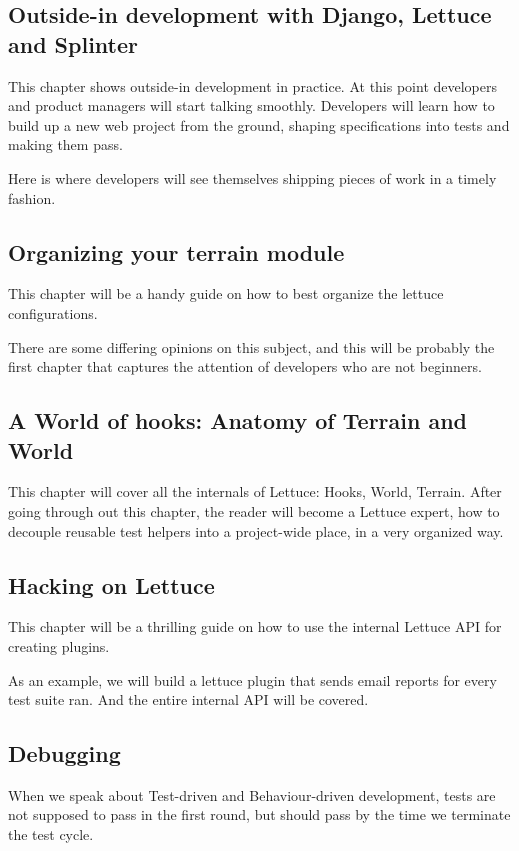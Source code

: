 \documentclass[letterpaper]{article}
\begin{document}
\subsection*{Outside-in development with Django, Lettuce and Splinter}
This chapter shows outside-in development in practice. At this point developers and
product managers will start talking smoothly.
Developers will learn how to build up a new web project from the
ground, shaping specifications into tests and making them pass.

Here is where developers will see themselves shipping pieces of work in a timely fashion.

\subsection*{Organizing your terrain module}
This chapter will be a handy guide on how to best organize the lettuce
configurations.

\noindent
There are some differing opinions on this subject, and this will be
probably the first chapter that captures the attention of developers
who are not beginners.

\subsection*{A World of hooks: Anatomy of Terrain and World}
This chapter will cover all the internals of Lettuce: Hooks, World,
Terrain.  After going through out this chapter, the reader will become
a Lettuce expert, how to decouple reusable test helpers into a
project-wide place, in a very organized way.

\subsection*{Hacking on Lettuce}
This chapter will be a thrilling guide on how to use the internal
Lettuce API for creating plugins.

\noindent
As an example, we will build a lettuce plugin that sends email reports
for every test suite ran. And the entire internal API will be covered.

\subsection*{Debugging}
When we speak about Test-driven and Behaviour-driven development,
tests are not supposed to pass in the first round, but should pass by
the time we terminate the test cycle.
\end{document}
